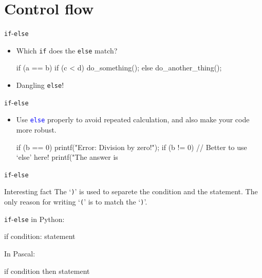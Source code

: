 \documentclass[handout]{beamer}
\newcommand{\blue}[1]{\textcolor{blue}{#1}}
\newcommand{\ttt}[1]{\texttt{#1}}
\newcommand{\bluett}[1]{\blue{\ttt{#1}}}
\begin{document}
\section{Control flow}

\begin{frame}[fragile]{\ttt{if}-\ttt{else}}
    \begin{itemize}
        \item Which \ttt{if} does the \ttt{else} match?
        \begin{cpp}
if (a == b)
    if (c < d)
        do_something();
else
    do_another_thing();
        \end{cpp}
        \pause
        \item Dangling \ttt{else}!
    \end{itemize}
\end{frame}

\begin{frame}[fragile]{\ttt{if}-\ttt{else}}
    \begin{itemize}
        \item Use \bluett{else} properly to avoid repeated calculation, and also make your code more robust.
        \begin{cpp}
if (b == 0)
    printf("Error: Division by zero!\n");
if (b != 0) // Better to use `else' here!
    printf("The answer is %
        \end{cpp}
    \end{itemize}
\end{frame}

\begin{frame}[fragile]{\ttt{if}-\ttt{else}}
    \begin{alertblock}{Interesting fact}
        The `\ttt{)}' is used to separete the condition and the statement. The only reason for writing `\ttt{(}' is to match the `\ttt{)}'.
    \end{alertblock}
    \ttt{if}-\ttt{else} in Python:
    \begin{cpp}
if condition:
    statement
    \end{cpp}
    In Pascal:
    \begin{cpp}
if condition then
    statement
    \end{cpp}
\end{frame}
\end{document}

